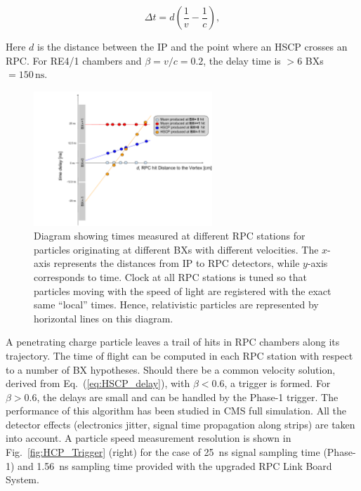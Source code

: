 \begin{equation}
\label{eq:HSCP_delay}
\Delta t = d\left(\frac{1}{v}-\frac{1}{c}\right),
\end{equation}

\noindent Here $d$ is the distance between the IP and the point where an HSCP crosses an RPC. 
For RE4/1 chambers and $\beta = v/c = 0.2$, the delay time is $>6$ BXs $= 150 \, \mathrm{ns}$.

\begin{figure}[h!tbp]
  \centering
  \includegraphics[width=0.6\textwidth]{figures/HSCP/diagram.pdf}
  \caption{
Diagram showing times measured at different RPC stations for particles originating at different BXs with different velocities. The $x$-axis represents the distances from IP to RPC detectors, while $y$-axis corresponds to time.
Clock at all RPC stations is tuned so that particles moving with the speed of light are registered with the exact same ``local'' times. Hence, relativistic particles are represented by horizontal lines on this diagram. 
  }
  \label{fig:HSCP_diagram}
\end{figure}


A penetrating charge particle leaves a trail of hits in RPC chambers along its trajectory.
The time of flight can be computed in each RPC station with respect to a number of BX hypotheses.
Should there be a common velocity solution, derived from Eq.~(\ref{eq:HSCP_delay}), 
with $\beta < 0.6$, a trigger is formed.
For $\beta >0.6$, the delays are small and can be handled by the Phase-1 trigger.  
The performance of this algorithm has been studied in CMS full simulation. All the detector effects 
(electronics jitter, signal time propagation along strips) are taken into account. 
A particle speed measurement resolution is shown in Fig.~\ref{fig:HCP_Trigger} (right) for the case of 25~ns
signal sampling time (Phase-1) and 1.56~ns sampling time provided with the upgraded RPC Link Board System.

